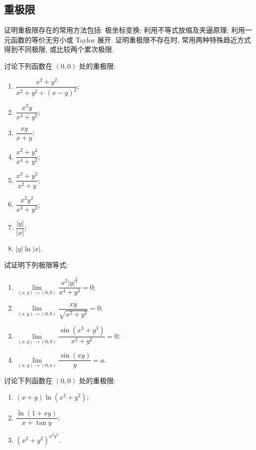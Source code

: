 \documentclass[../数学分析培优讲义.tex]{subfiles}
\begin{document}
\newpage

\subsection{重极限}

证明重极限存在的常用方法包括: 极坐标变换; 利用不等式放缩及夹逼原理; 利用一元函数的等价无穷小或 Taylor 展开. 证明重极限不存在时, 常用两种特殊趋近方式得到不同极限, 或比较两个累次极限.

\begin{example}
讨论下列函数在 $(0,0)$ 处的重极限:
\begin{enumerate}[label=(\arabic*)]
    \item $\displaystyle\dfrac{x^2+y^2}{x^2+y^2+(x-y)^2}$;
    \item $\displaystyle\dfrac{x^2y}{x^4+y^2}$;
    \item $\displaystyle\dfrac{xy}{x+y}$;
    \item $\displaystyle\dfrac{x^2+y^4}{x^4+y^2}$;
    \item $\displaystyle\dfrac{x^3+y^3}{x^2+y}$;
    \item $\displaystyle\dfrac{x^2y^2}{x^3+y^3}$;
    \item $\displaystyle\dfrac{|y|}{|x|}$;
    \item $|y|\ln|x|$.
\end{enumerate}
\end{example}
\exampleblank

\begin{example}
试证明下列极限等式:
\begin{enumerate}[label=(\arabic*)]
    \item $\displaystyle\lim\limits_{(x,y)\to(0,0)}\dfrac{x^2|y|^{\frac{3}{2}}}{x^4+y^2}=0$;
    \item $\displaystyle\lim\limits_{(x,y)\to(0,0)}\dfrac{xy}{\sqrt{x^2+y^2}}=0$;
    \item $\displaystyle\lim\limits_{(x,y)\to(0,0)}\dfrac{\sin(x^3+y^3)}{x^2+y^2}=0$;
    \item $\displaystyle\lim\limits_{(x,y)\to(0,a)}\dfrac{\sin(xy)}{y}=a$.
\end{enumerate}
\end{example}
\exampleblank

\begin{example}
讨论下列函数在 $(0,0)$ 处的重极限:
\begin{enumerate}[label=(\arabic*)]
    \item $(x+y)\ln(x^2+y^2)$;
    \item $\displaystyle\dfrac{\ln(1+xy)}{x+\tan y}$;
    \item $(x^2+y^2)^{x^2y^2}$.
\end{enumerate}
\end{example}
\exampleblank
\end{document}
